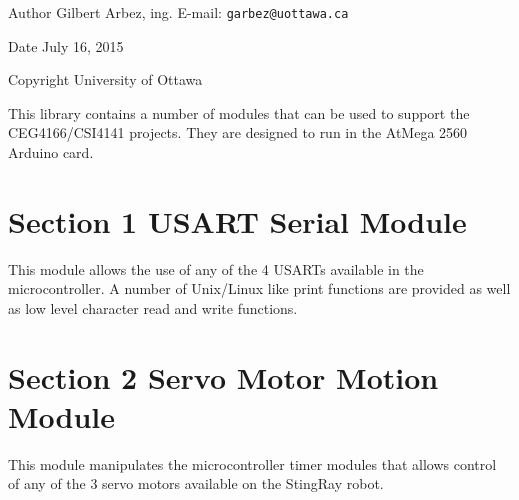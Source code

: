 \begin{DoxyAuthor}{Author}
Gilbert Arbez, ing. E-\/mail\+: {\tt garbez@uottawa.\+ca} 
\end{DoxyAuthor}
\begin{DoxyDate}{Date}
July 16, 2015 
\end{DoxyDate}
\begin{DoxyCopyright}{Copyright}
University of Ottawa 
\end{DoxyCopyright}
\begin{DoxyParagraph}{This library contains a number of modules that can be used to support the C\+E\+G4166/\+C\+S\+I4141 projects. They are designed to }
run in the At\+Mega 2560 Arduino card. 
\end{DoxyParagraph}
\section{Section 1 U\+S\+A\+R\+T Serial Module}\label{index_section_name_1}
\begin{DoxyParagraph}{This module allows the use of any of the 4 U\+S\+A\+R\+Ts available in the microcontroller. A number of Unix/\+Linux like print functions are provided as well as low level character read and write functions.}
~\newline

\end{DoxyParagraph}
\section{Section 2 Servo Motor Motion Module}\label{index_section_name_2}
\begin{DoxyParagraph}{This module manipulates the microcontroller timer modules that allows control of any of the 3 servo motors available on the Sting\+Ray robot.}

\end{DoxyParagraph}


 